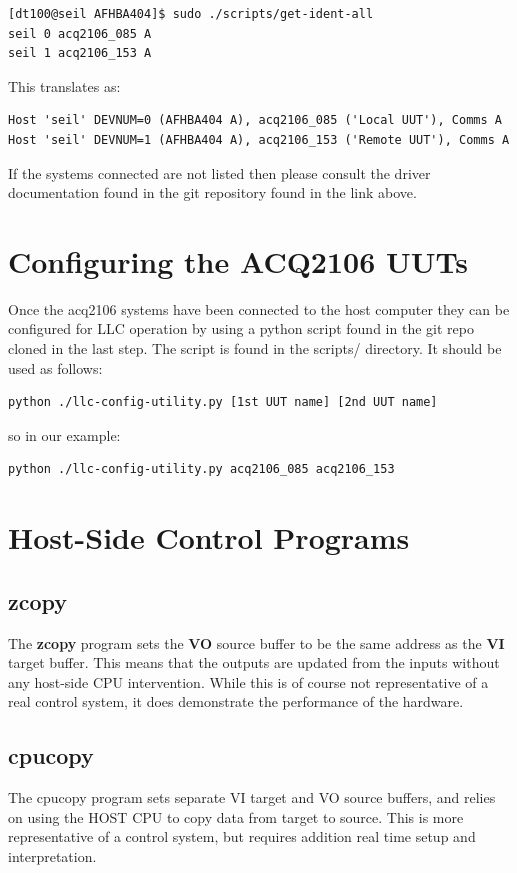 \documentclass{article}
\begin{document}
\begin{verbatim}
[dt100@seil AFHBA404]$ sudo ./scripts/get-ident-all 
seil 0 acq2106_085 A
seil 1 acq2106_153 A
\end{verbatim}

This translates as:
\begin{verbatim}
Host 'seil' DEVNUM=0 (AFHBA404 A), acq2106_085 ('Local UUT'), Comms A
Host 'seil' DEVNUM=1 (AFHBA404 A), acq2106_153 ('Remote UUT'), Comms A
\end{verbatim}

If the systems connected are not listed then please consult the driver documentation found in the git repository found in the link above.

\section{Configuring the ACQ2106 UUTs}
Once the acq2106 systems have been connected to the host computer they can be configured for LLC operation by using a python script found in the git repo cloned in the last step.
The script is found in the scripts/ directory.
It should be used as follows:
\begin{verbatim}
python ./llc-config-utility.py [1st UUT name] [2nd UUT name]
\end{verbatim}

so in our example:

\begin{verbatim}
python ./llc-config-utility.py acq2106_085 acq2106_153
\end{verbatim}

\section{Host-Side Control Programs}

\subsection{zcopy}

The \textbf{zcopy} program sets the \textbf{VO} source buffer to be the same address as the \textbf{VI} target buffer.
This means that the outputs are updated from the inputs without any host-side CPU intervention.
While this is of course not representative of a real control system, it does demonstrate the performance of the hardware.

\subsection{cpucopy}
The cpucopy program sets separate VI target and VO source buffers, and relies on using the HOST CPU to copy data from target to source.
This is more representative of a control system, but requires addition real time setup and interpretation.
\end{document}
